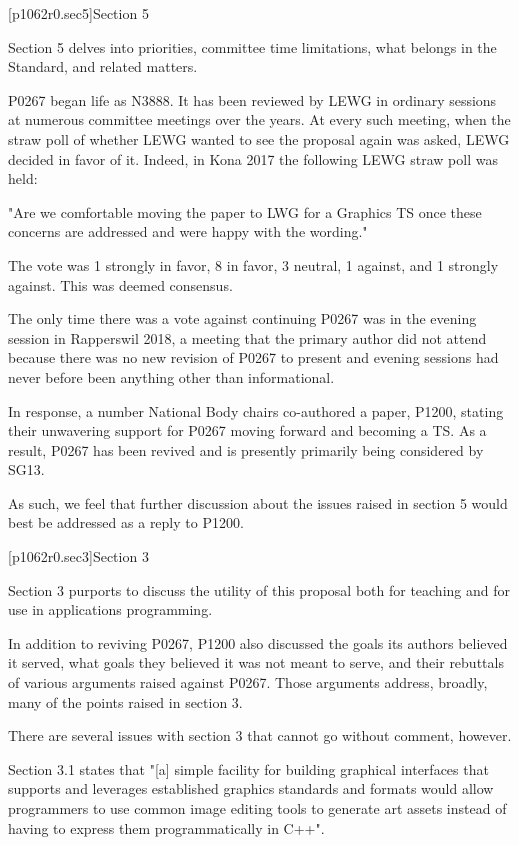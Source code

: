 [p1062r0.sec5]{Section 5}

\pnum
Section 5 delves into priorities, committee time limitations, what belongs in the Standard, and related matters.

\pnum
P0267 began life as N3888. It has been reviewed by LEWG in ordinary sessions at numerous committee meetings over the years. At every such meeting, when the straw poll of whether LEWG wanted to see the proposal again was asked, LEWG decided in favor of it. Indeed, in Kona 2017 the following LEWG straw poll was held:

\pnum
"Are we comfortable moving the paper to LWG for a Graphics TS once these concerns are addressed and were happy with the wording."

\pnum
The vote was 1 strongly in favor, 8 in favor, 3 neutral, 1 against, and 1 strongly against. This was deemed consensus.

\pnum
The only time there was a vote against continuing P0267 was in the evening session in Rapperswil 2018, a meeting that the primary author did not attend because there was no new revision of P0267 to present and evening sessions had never before been anything other than informational.

\pnum
In response, a number National Body chairs co-authored a paper, P1200, stating their unwavering support for P0267 moving forward and becoming a TS. As a result, P0267 has been revived and is presently primarily being considered by SG13.

\pnum
As such, we feel that further discussion about the issues raised in section 5 would best be addressed as a reply to P1200.

[p1062r0.sec3]{Section 3}

\pnum
Section 3 purports to discuss the utility of this proposal both for teaching and for use in applications programming.

\pnum
In addition to reviving P0267, P1200 also discussed the goals its authors believed it served, what goals they believed it was not meant to serve, and their rebuttals of various arguments raised against P0267. Those arguments address, broadly, many of the points raised in section 3.

\pnum
There are several issues with section 3 that cannot go without comment, however.

\pnum
Section 3.1 states that "[a] simple facility for building graphical interfaces that supports and leverages established graphics standards and formats would allow programmers to use common image editing tools to generate art assets instead of having to express them programmatically in C++".

